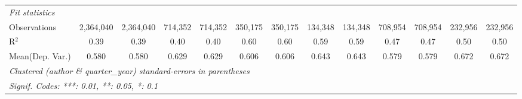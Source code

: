 \begin{tabular}{lcccccccccccc}
   \midrule
   \emph{Fit statistics}\\
   Observations                             & 2,364,040     & 2,364,040    & 714,352       & 714,352      & 350,175      & 350,175     & 134,348       & 134,348      & 708,954      & 708,954        & 232,956       & 232,956\\  
   R$^2$                                    & 0.39          & 0.39         & 0.40          & 0.40         & 0.60         & 0.60        & 0.59          & 0.59         & 0.47         & 0.47           & 0.50          & 0.50\\  
Mean(Dep. Var.) & 0.580 & 0.580 & 0.629 & 0.629 & 0.606 & 0.606 & 0.643 & 0.643 & 0.579 & 0.579 & 0.672 & 0.672 \\
   \midrule \midrule
   \multicolumn{13}{l}{\emph{Clustered (author \& quarter\_year) standard-errors in parentheses}}\\
   \multicolumn{13}{l}{\emph{Signif. Codes: ***: 0.01, **: 0.05, *: 0.1}}\\
\end{tabular}
\par\endgroup
